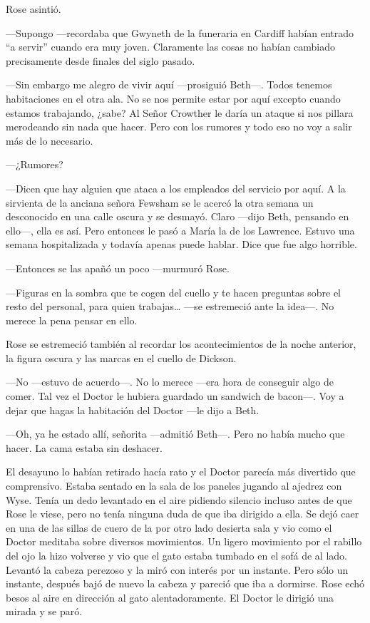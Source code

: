 {Rose asintió.}

{---Supongo ---recordaba que Gwyneth de la funeraria en Cardiff habían
	entrado ``a servir'' cuando era muy joven. Claramente las cosas no
habían cambiado precisamente desde finales del siglo pasado.}

{---Sin embargo me alegro de vivir aquí ---prosiguió Beth---. Todos
	tenemos habitaciones en el otra ala. No se nos permite estar por aquí
	excepto cuando estamos trabajando, ¿sabe? Al Señor Crowther le daría un
	ataque si nos pillara merodeando sin nada que hacer. Pero con los
rumores y todo eso no voy a salir más de lo necesario.}

{---¿Rumores?}

{---Dicen que hay alguien que ataca a los empleados del servicio por
	aquí. A la sirvienta de la anciana señora Fewsham se le acercó la otra
	semana un desconocido en una calle oscura y se desmayó. Claro ---dijo
	Beth, pensando en ello---, ella es así. Pero entonces le pasó a María la
	de los Lawrence. Estuvo una semana hospitalizada y todavía apenas puede
hablar. Dice que fue algo horrible.}

{---Entonces se las apañó un poco ---murmuró Rose.}

{---Figuras en la sombra que te cogen del cuello y te hacen preguntas
	sobre el resto del personal, para quien trabajas\ldots{} ---se
estremeció ante la idea---. No merece la pena pensar en ello.}

{Rose se estremeció también al recordar los acontecimientos de la noche
anterior, la figura oscura y las marcas en el cuello de Dickson.}

{---No ---estuvo de acuerdo---. No lo merece ---era hora de conseguir
	algo de comer. Tal vez el Doctor le hubiera guardado un sandwich de
	bacon---. Voy a dejar que hagas la habitación del Doctor ---le dijo a
Beth.}

{---Oh, ya he estado allí, señorita ---admitió Beth---. Pero no había
mucho que hacer. La cama estaba sin deshacer.}

{El desayuno lo habían retirado hacía rato y el Doctor parecía más
	divertido que comprensivo. Estaba sentado en la sala de los paneles
	jugando al ajedrez con Wyse. Tenía un dedo levantado en el aire pidiendo
	silencio incluso antes de que Rose le viese, pero no tenía ninguna duda
	de que iba dirigido a ella. Se dejó caer en una de las sillas de cuero
	de la por otro lado desierta sala y vio como el Doctor meditaba sobre
	diversos movimientos. Un ligero movimiento por el rabillo del ojo la
	hizo volverse y vio que el gato estaba tumbado en el sofá de al lado.
	Levantó la cabeza perezoso y la miró con interés por un instante. Pero
	sólo un instante, después bajó de nuevo la cabeza y pareció que iba a
	dormirse. Rose echó besos al aire en dirección al gato alentadoramente.
El Doctor le dirigió una mirada y se paró.}

